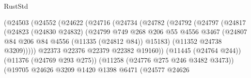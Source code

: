 \begin{lexlean}{RustStd}
\begin{coremodule}
{{{{{{{{{{{{{{{{{{{                                      (@24503
                                        (@24552
                                          (@24622
                                            (@24716
                                              (@24734
                                                (@24782
                                                  (@24792
                                                    (@24797
                                                      (@24817
                                                        (@24823
                                                          (@24830 @24832)
                                                          (@24799
                                                            @749
                                                            @268
                                                            @206
                                                            @55
                                                            @4556
                                                            @3467
                                                            (@24807
                                                              @84
                                                              @206
                                                              @84
                                                              @4556
                                                              (@11335 (@24812 @84))
                                                              @15183)
                                                            (@11352 @24738 @3209)))))
                                                    @22373
                                                    @22376
                                                    @22379
                                                    @22382
                                                    @19160))
                                                (@11445 (@24764 @244))
                                                (@11376 (@24769 @293 @275))
                                                (@11258 (@24776 @275 @246 @3482 @3473))
                                                (@19705
                                                  @24626
                                                  @3209
                                                  @1420
                                                  @1398
                                                  @6471
                                                  (@24577
                                                    @24626
}}}}}}}}}}}}}}}}}}}
\end{coremodule}
\end{lexlean}
